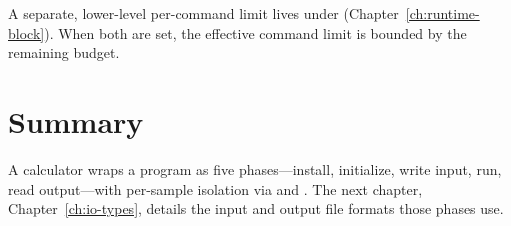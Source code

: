 \begin{jnote}
A separate, lower-level per-command limit lives under 
(Chapter~\ref{ch:runtime-block}). When both are set, the effective command limit is bounded by
the remaining  budget.
\end{jnote}

\section{Summary}
\label{sec:calc-summary}

A calculator wraps a program as five phases---install, initialize, write input, run, read
output---with per-sample isolation via  and . The next
chapter, Chapter~\ref{ch:io-types}, details the input and output file formats those phases use.
